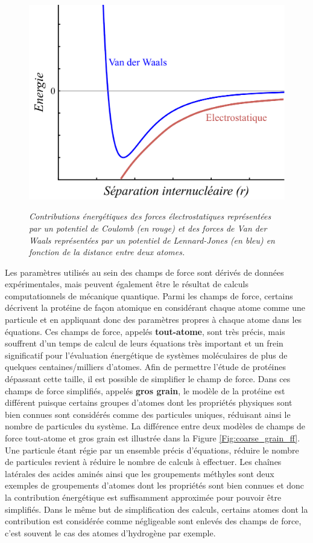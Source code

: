 \begin{figure}
  \centering
  {\includegraphics[width=0.75\linewidth]{./figures/ch1/electro_lennardjones.pdf}}
    \caption{\it Contributions énergétiques des forces électrostatiques représentées par un potentiel de Coulomb (en rouge) et des forces de Van der Waals représentées par un potentiel de Lennard-Jones (en bleu) en fonction de la distance entre deux atomes.}
    \label{Fig:coulomb_lennardjones}
  \hspace{0.3cm}
\end{figure}

Les paramètres utilisés au sein des champs de force sont dérivés de données expérimentales, mais peuvent également être le résultat de calculs computationnels de mécanique quantique. Parmi les champs de force, certains décrivent la protéine de façon atomique en considérant chaque atome comme une particule et en appliquant donc des paramètres propres à chaque atome dans les équations. Ces champs de force, appelés \textbf{tout-atome}, sont très précis, mais souffrent d'un temps de calcul de leurs équations très important et un frein significatif pour l'évaluation énergétique de systèmes moléculaires de plus de quelques centaines/milliers d'atomes. Afin de permettre l'étude de protéines dépassant cette taille, il est possible de simplifier le champ de force. Dans ces champs de force simplifiés, appelés \textbf{gros grain}, le modèle de la protéine est différent puisque certains groupes d'atomes dont les propriétés physiques sont bien connues sont considérés comme des particules uniques, réduisant ainsi le nombre de particules du système. La différence entre deux modèles de champs de force tout-atome et gros grain est illustrée dans la Figure \ref{Fig:coarse_grain_ff}. Une particule étant régie par un ensemble précis d'équations, réduire le nombre de particules revient à réduire le nombre de calculs à effectuer. Les chaînes latérales des acides aminés ainsi que les groupements méthyles sont deux exemples de groupements d'atomes dont les propriétés sont bien connues et donc la contribution énergétique est suffisamment approximée pour pouvoir être simplifiés. Dans le même but de simplification des calculs, certains atomes dont la contribution est considérée comme négligeable sont enlevés des champs de force, c'est souvent le cas des atomes d'hydrogène par exemple.

